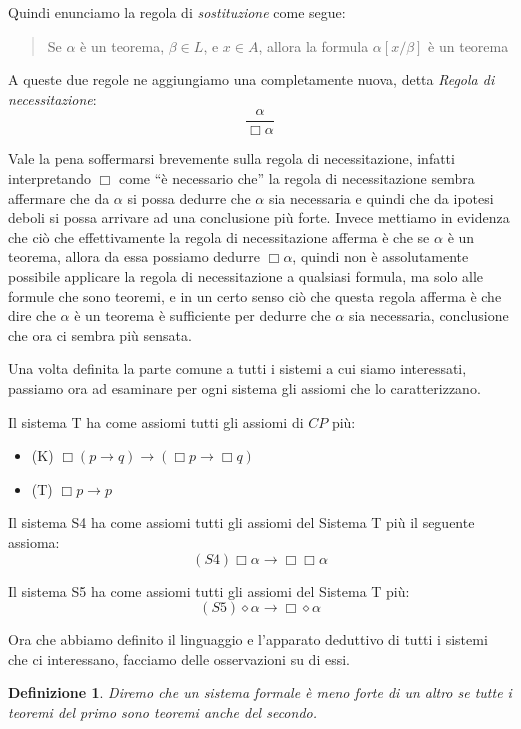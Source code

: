 \documentclass[a4paper, titlepage, 12pt]{report}
\newtheorem{definition}{Definizione}[chapter]
\begin{document}
Quindi enunciamo la regola di \emph{sostituzione} come segue:
\begin{quote}
Se $\alpha$ è un teorema, $\beta \in L$, e
$x \in A$, allora la formula $\alpha[x/\beta]$ è un teorema
\end{quote}

A queste due regole ne aggiungiamo una completamente nuova,
detta \emph{Regola di necessitazione}:
$$\frac{\alpha}{\Box \alpha}$$

Vale la pena soffermarsi brevemente sulla regola di necessitazione, 
infatti interpretando $\Box$ come ``è necessario che'' la regola di necessitazione
sembra affermare che da $\alpha$ si possa dedurre che $\alpha$ sia necessaria e quindi
che da ipotesi deboli si possa arrivare ad una conclusione più forte.
Invece mettiamo in evidenza che ciò che effettivamente la regola di necessitazione
afferma è che se $\alpha$ è un teorema, allora da essa possiamo dedurre $\Box \alpha$,
quindi non è assolutamente possibile applicare la regola di necessitazione
a qualsiasi formula, ma solo alle formule che sono teoremi, e in un certo senso
ciò che questa regola afferma è che dire che $\alpha$ è un teorema
è sufficiente per dedurre che $\alpha$
sia necessaria, conclusione che ora ci sembra più sensata.


Una volta definita la parte comune a tutti i sistemi a cui siamo interessati,
passiamo ora ad esaminare per ogni sistema gli assiomi che lo caratterizzano.

Il sistema T ha come assiomi tutti gli assiomi di $CP$ più:
\begin{itemize}
\item (K) $\Box (p \rightarrow q) \rightarrow (\Box p \rightarrow \Box q)$
\item (T) $\Box p \rightarrow p$
\end{itemize}

Il sistema S4 ha come assiomi tutti gli assiomi del Sistema T più il seguente assioma:
$$(S4) \Box \alpha \rightarrow \Box \Box \alpha$$

Il sistema S5 ha come assiomi tutti gli assiomi del Sistema T più:
$$(S5) \diamond \alpha \rightarrow \Box \diamond \alpha$$


Ora che abbiamo definito il linguaggio e l'apparato deduttivo di tutti i sistemi
che ci interessano, facciamo delle osservazioni su di essi.
\begin{definition}
Diremo che un sistema formale è meno forte di un altro se tutte i teoremi del primo
sono teoremi anche del secondo.
\end{definition}
\end{document}
